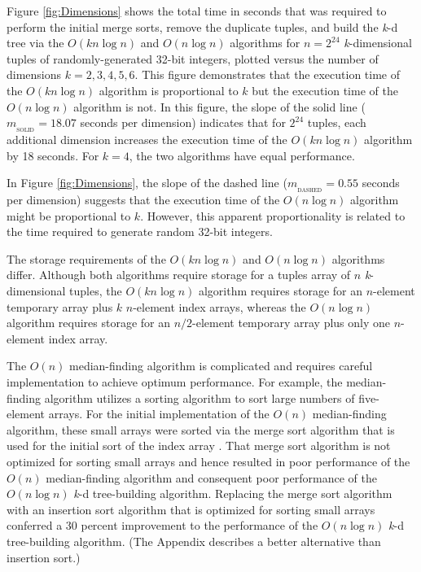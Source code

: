 \documentclass{sig-alternate}
\begin{document}
Figure \ref{fig:Dimensions} shows the total time in seconds that was required to perform the initial merge sorts, remove the duplicate tuples, and build the \emph{k}-d tree via the $O\left(kn \log n\right)$ and $O\left(n \log n\right)$ algorithms for $n = 2^{24}$ \emph{k}-dimensional tuples of randomly-generated 32-bit integers, plotted versus the number of dimensions $k=2, 3, 4, 5, 6$.  This figure demonstrates that the execution time of the $O\left(kn \log n\right)$ algorithm is proportional to $k$ but the execution time of the $O\left(n \log n\right)$ algorithm is not.  In this figure, the slope of the solid line ($m_{_\mathrm{SOLID}}=18.07$ seconds per dimension) indicates that for $2^{24}$ tuples, each additional dimension increases the execution time of the $O\left(kn \log n\right)$ algorithm by 18 seconds.  For $k=4$, the two algorithms have equal performance.

In Figure \ref{fig:Dimensions}, the slope of the dashed line ($m_{_\mathrm{DASHED}}=0.55$ seconds per dimension) suggests that the execution time of the $O\left(n \log n\right)$ algorithm might be proportional to $k$.  However, this apparent proportionality is related to the time required to generate random 32-bit integers.

The storage requirements of the $O\left(kn \log n\right)$ and $O\left(n \log n\right)$ algorithms differ.  Although both algorithms require storage for a tuples array of $n$ \emph{k}-dimensional tuples, the $O\left(kn \log n\right)$ algorithm requires storage for an $n$-element temporary array plus $k$ $n$-element index arrays, whereas the $O\left(n \log n\right)$ algorithm requires storage for an $n/2$-element temporary array plus only one $n$-element index array.
  
The $O\left(n\right)$ median-finding algorithm is complicated and requires careful implementation to achieve optimum performance.  For example, the median-finding algorithm utilizes a sorting algorithm to sort large numbers of five-element arrays.  For the initial implementation of the $O\left(n\right)$ median-finding algorithm, these small arrays were sorted via the merge sort algorithm that is used for the initial sort of the index array \cite{Sedgewick}.  That merge sort algorithm is not optimized for sorting small arrays and hence resulted in poor performance of the $O\left(n\right)$ median-finding algorithm and consequent poor performance of the $O\left(n \log n\right)$ \emph{k}-d tree-building algorithm.  Replacing the merge sort algorithm with an insertion sort algorithm that is optimized for sorting small arrays \cite{Bentley2} conferred a 30 percent improvement to the performance of the $O\left(n \log n\right)$  \emph{k}-d tree-building algorithm.  (The Appendix describes a better alternative than insertion sort.)
\end{document}
